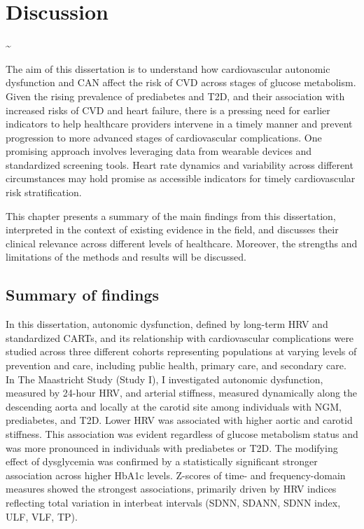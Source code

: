 \documentclass[
  a4paper,
  headsepline=true,
  open=any]{scrbook}
\begin{document}

\hypertarget{discussion}{%
\chapter{Discussion}\label{discussion}}

\newpage

\thispagestyle{empty}

\textasciitilde{} \newpage

The aim of this dissertation is to understand how cardiovascular
autonomic dysfunction and CAN affect the risk of CVD across stages of
glucose metabolism. Given the rising prevalence of prediabetes and T2D,
and their association with increased risks of CVD and heart failure,
there is a pressing need for earlier indicators to help healthcare
providers intervene in a timely manner and prevent progression to more
advanced stages of cardiovascular complications. One promising approach
involves leveraging data from wearable devices and standardized
screening tools. Heart rate dynamics and variability across different
circumstances may hold promise as accessible indicators for timely
cardiovascular risk stratification.

This chapter presents a summary of the main findings from this
dissertation, interpreted in the context of existing evidence in the
field, and discusses their clinical relevance across different levels of
healthcare. Moreover, the strengths and limitations of the methods and
results will be discussed.

\newpage

\hypertarget{summary-of-findings}{%
\section{Summary of findings}\label{summary-of-findings}}

In this dissertation, autonomic dysfunction, defined by long-term HRV
and standardized CARTs, and its relationship with cardiovascular
complications were studied across three different cohorts representing
populations at varying levels of prevention and care, including public
health, primary care, and secondary care. In The Maastricht Study (Study
I), I investigated autonomic dysfunction, measured by 24-hour HRV, and
arterial stiffness, measured dynamically along the descending aorta and
locally at the carotid site among individuals with NGM, prediabetes, and
T2D. Lower HRV was associated with higher aortic and carotid stiffness.
This association was evident regardless of glucose metabolism status and
was more pronounced in individuals with prediabetes or T2D. The
modifying effect of dysglycemia was confirmed by a statistically
significant stronger association across higher HbA1c levels. Z-scores of
time- and frequency-domain measures showed the strongest associations,
primarily driven by HRV indices reflecting total variation in interbeat
intervals (SDNN, SDANN, SDNN index, ULF, VLF, TP).
\end{document}
